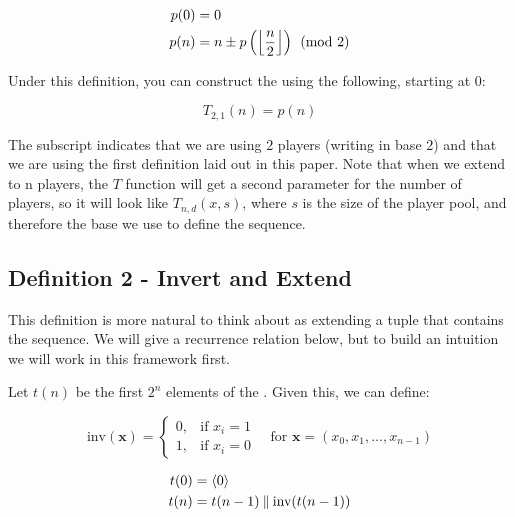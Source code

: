 \documentclass[conference]{IEEEtran}
\begin{document}
\begin{equation}
    \begin{aligned}
        p(0) &= 0 \\
        p(n) &= n \pm p\left(\left\lfloor \dfrac{n}{2} \right\rfloor\right) \pmod{2}
    \end{aligned}
\end{equation}

Under this definition, you can construct the \TMS using the following, starting at $0$:

\begin{equation}
    T_{2,1}(n) = p(n)
\end{equation}

The subscript indicates that we are using $2$ players (writing in base $2$) and that we are using the first definition laid out in this paper. Note that when we extend to n players, the $T$ function will get a second parameter for the number of players, so it will look like $T_{n,d}(x, s)$, where $s$ is the size of the player pool, and therefore the base we use to define the sequence.

\subsection{Definition 2 - Invert and Extend}


This definition is more natural to think about as extending a tuple that contains the sequence. We will give a recurrence relation below, but to build an intuition we will work in this framework first.

Let $t(n)$ be the first $2^n$ elements of the \TMS. Given this, we can define:

\begin{equation}
    \text{inv}(\mathbf{x}) = \begin{cases}
        0, & \text{if } x_i = 1 \\
        1, & \text{if } x_i = 0
    \end{cases} \quad \text{for } \mathbf{x} = (x_0, x_1, \ldots, x_{n-1})
\end{equation}

\begin{equation}
    \begin{aligned}
        t(0) &= \langle 0 \rangle \\
        t(n) &= t(n - 1) \mathbin{\|} \text{inv}(t(n - 1))
    \end{aligned}
\end{equation}
\end{document}
